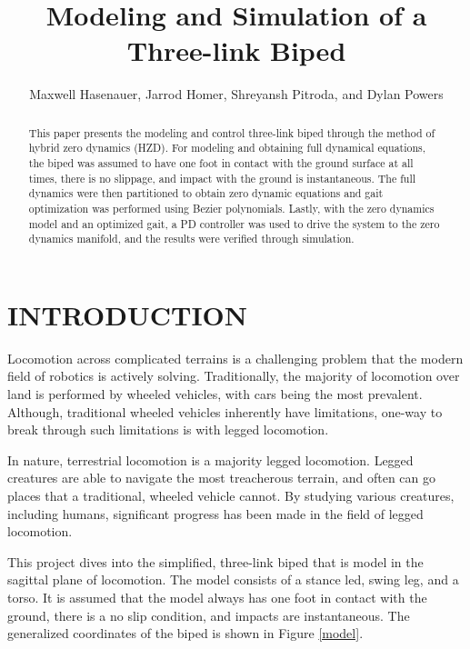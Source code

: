 \documentclass[letterpaper, 10 pt, conference]{ieeeconf}  %
\title{\LARGE \bf
Modeling and Simulation of a Three-link Biped 
}
\author{Maxwell Hasenauer, Jarrod Homer, Shreyansh Pitroda, and Dylan Powers %
}
\begin{document}
\maketitle
\thispagestyle{empty}
\pagestyle{empty}


\begin{abstract}

This paper presents the modeling and control three-link biped through the method of hybrid zero dynamics (HZD). For modeling and obtaining full dynamical equations, the biped was assumed to have one foot in contact with the ground surface at all times, there is no slippage, and impact with the ground is instantaneous. The full dynamics were then partitioned to obtain zero dynamic equations and gait optimization was performed using Bezier polynomials. Lastly, with the zero dynamics model and an optimized gait, a PD controller was used to drive the system to the zero dynamics manifold, and the results were verified through simulation. 

\end{abstract}


\section{INTRODUCTION}

Locomotion across complicated terrains is a challenging problem that the modern field of robotics is actively solving. Traditionally, the majority of locomotion over land is performed by wheeled vehicles, with cars being the most prevalent. Although, traditional wheeled vehicles inherently have limitations, one-way to break through such limitations is with legged locomotion. 

\indent In nature, terrestrial locomotion is a majority legged locomotion. Legged creatures are able to navigate the most treacherous terrain, and often can go places that a traditional, wheeled vehicle cannot. By studying various creatures, including humans, significant progress has been made in the field of legged locomotion. 

\indent This project dives into the simplified, three-link biped that is model in the sagittal plane of locomotion. The model consists of a stance led, swing leg, and a torso. It is assumed that the model always has one foot in contact with the ground, there is a no slip condition, and impacts are instantaneous. The generalized coordinates of the biped is shown in Figure \ref{model}.
\end{document}
